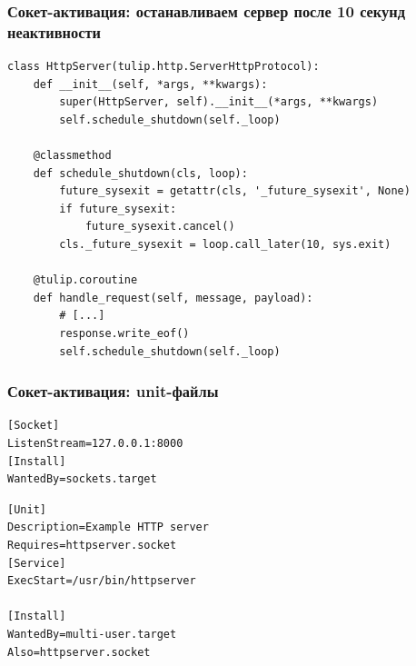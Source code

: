 \documentclass[aspectratio=169]{beamer}
\begin{document}
\begin{frame}[fragile]
  \frametitle{Сокет-активация: останавливаем сервер после 10 секунд неактивности}

  \begin{lstlisting}
class HttpServer(tulip.http.ServerHttpProtocol):
    def __init__(self, *args, **kwargs):
        super(HttpServer, self).__init__(*args, **kwargs)
        self.schedule_shutdown(self._loop)

    @classmethod
    def schedule_shutdown(cls, loop):
        future_sysexit = getattr(cls, '_future_sysexit', None)
        if future_sysexit:
            future_sysexit.cancel()
        cls._future_sysexit = loop.call_later(10, sys.exit)

    @tulip.coroutine
    def handle_request(self, message, payload):
        # [...]
        response.write_eof()
        self.schedule_shutdown(self._loop)
  \end{lstlisting}

\end{frame}


\begin{frame}[fragile]
  \frametitle{Сокет-активация: unit-файлы}

  \begin{lstlisting}[caption=/usr/lib/systemd/system/httpserver.socket]
[Socket]
ListenStream=127.0.0.1:8000
[Install]
WantedBy=sockets.target
  \end{lstlisting}

  \begin{lstlisting}[caption=/usr/lib/systemd/system/httpserver.service]
[Unit]
Description=Example HTTP server
Requires=httpserver.socket
[Service]
ExecStart=/usr/bin/httpserver

[Install]
WantedBy=multi-user.target
Also=httpserver.socket
  \end{lstlisting}

\end{frame}
\end{document}
